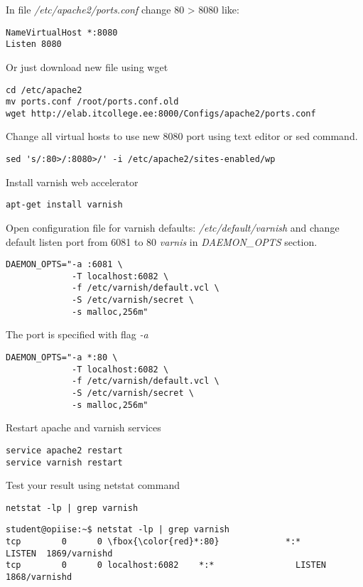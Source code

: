 In file \emph{ /etc/apache2/ports.conf} change 80 > 8080 like:
\begin{verbatim}
NameVirtualHost *:8080
Listen 8080
\end{verbatim}
Or just download new file using wget 
\begin{verbatim}
cd /etc/apache2
mv ports.conf /root/ports.conf.old
wget http://elab.itcollege.ee:8000/Configs/apache2/ports.conf
\end{verbatim}
Change all virtual hosts to use new 8080 port using text editor or sed command.

\begin{verbatim}
sed 's/:80>/:8080>/' -i /etc/apache2/sites-enabled/wp
\end{verbatim}


Install varnish web accelerator 

\begin{verbatim}
apt-get install varnish
\end{verbatim}

Open configuration file for varnish defaults: \emph{/etc/default/varnish} and change default listen port from 6081 to 80 \emph{varnis}  in \emph{DAEMON\_OPTS} section.
\begin{verbatim}
DAEMON_OPTS="-a :6081 \
             -T localhost:6082 \
             -f /etc/varnish/default.vcl \
             -S /etc/varnish/secret \
             -s malloc,256m" 
\end{verbatim}
The port is specified with flag \emph{-a}
\begin{verbatim}
DAEMON_OPTS="-a *:80 \
             -T localhost:6082 \
             -f /etc/varnish/default.vcl \
             -S /etc/varnish/secret \
             -s malloc,256m" 
\end{verbatim}

Restart apache and varnish services
\begin{verbatim}
service apache2 restart
service varnish restart
\end{verbatim}
Test your result using netstat command

\begin{verbatim}
netstat -lp | grep varnish
\end{verbatim}


\begin{Verbatim}[frame=single,
label=Command output,framesep=2mm,rulecolor=\color{red},commandchars=\\\{\}]
student@opiise:~$ netstat -lp | grep varnish
tcp        0      0 \fbox{\color{red}*:80}             *:*                LISTEN  1869/varnishd   
tcp        0      0 localhost:6082    *:*                LISTEN  1868/varnishd   
\end{Verbatim}

